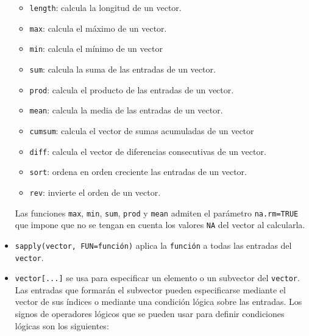 \documentclass[]{book}
\providecommand{\tightlist}{%
  \setlength{\itemsep}{0pt}\setlength{\parskip}{0pt}}
\theoremstyle{definition}
\theoremstyle{definition}
\theoremstyle{definition}
\theoremstyle{remark}
\begin{document}
\begin{itemize}
  \begin{itemize}
  \tightlist
  \item
    \texttt{length}: calcula la longitud de un vector.
  \item
    \texttt{max}: calcula el máximo de un vector.
  \item
    \texttt{min}: calcula el mínimo de un vector
  \item
    \texttt{sum}: calcula la suma de las entradas de un vector.
  \item
    \texttt{prod}: calcula el producto de las entradas de un vector.
  \item
    \texttt{mean}: calcula la media de las entradas de un vector.
  \item
    \texttt{cumsum}: calcula el vector de sumas acumuladas de un vector
  \item
    \texttt{diff}: calcula el vector de diferencias consecutivas de un vector.
  \item
    \texttt{sort}: ordena en orden creciente las entradas de un vector.
  \item
    \texttt{rev}: invierte el orden de un vector.
  \end{itemize}

  Las funciones \texttt{max}, \texttt{min}, \texttt{sum}, \texttt{prod} y \texttt{mean} admiten el parámetro \texttt{na.rm=TRUE} que impone que no se tengan en cuenta los valores \texttt{NA} del vector al calcularla.
\item
  \texttt{sapply(vector,\ FUN=función)} aplica la \texttt{función} a todas las entradas del \texttt{vector}.
\item
  \texttt{vector{[}...{]}} se usa para especificar un elemento o un subvector del \texttt{vector}. Las entradas que formarán el subvector pueden especificarse mediante el vector de sus índices o mediante una condición lógica sobre las entradas. Los signos de operadores lógicos que se pueden usar para definir condiciones lógicas son los siguientes:


\end{itemize}
\end{document}
